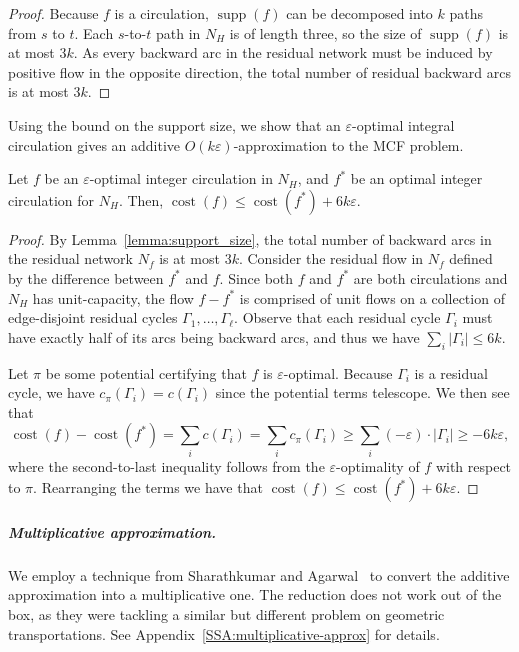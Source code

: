 \documentclass[a4paper,UKenglish]{socg-lipics-v2018}
\def\eps{\varepsilon}
\def\cost{\operatorname{cost}}
\def\supp{\operatorname{supp}}
\theoremstyle{plain}
\numberwithin{figure}{section}
\renewcommand{\paragraph}{\subparagraph}
\begin{document}
\begin{proof}
Because $f$ is a circulation, $\supp(f)$ can be decomposed into $k$  paths from $s$ to $t$.
Each $s$-to-$t$ path in $N_H$ is of length three, so the size of $\supp(f)$ is at most $3k$.
As every backward arc in the residual network must be induced by positive flow in the opposite direction,
the total number of residual backward arcs is at most $3k$.
\end{proof}

Using the bound on the support size, we show that an $\eps$-optimal integral circulation gives an additive $O(k\eps)$-approximation to the MCF problem.

\begin{lemmarep}
\label{lemma:goldberg_cost_add}
Let $f$ be an $\eps$-optimal integer circulation in $N_H$, and $f^*$ be an optimal integer circulation for $N_H$.
Then, $\cost(f) \leq \cost(f^*) + 6k\eps$.
\end{lemmarep}

\begin{proof}
By Lemma~\ref{lemma:support_size}, the total number of backward arcs in the residual network $N_f$ is at most $3k$.
%
Consider the residual flow in $N_f$ defined by the difference between $f^*$ and $f$.
Since both $f$ and $f^*$ are both circulations and $N_H$ has unit-capacity,
the flow $f - f^*$ is comprised of unit flows on a collection of edge-disjoint residual cycles $\Gamma_1, \ldots, \Gamma_\ell$.
Observe that each residual cycle $\Gamma_i$ must have exactly half of its arcs being backward arcs, and thus we have $\sum_i |\Gamma_i| \leq 6k$.

Let $\pi$ be some potential certifying that $f$ is $\eps$-optimal.
Because $\Gamma_i$ is a residual cycle, we have $c_\pi(\Gamma_i) = c(\Gamma_i)$ since the potential terms telescope.
We then see that
\[
	\cost(f) - \cost(f^*)
	= \sum_i c(\Gamma_i)
	= \sum_i c_\pi(\Gamma_i)
	\geq \sum_i (-\eps) \cdot |\Gamma_i|
	\geq -6k\eps,
\]
where the second-to-last inequality follows from the $\eps$-optimality of $f$
with respect to $\pi$.
Rearranging the terms we have that $\cost(f) \leq \cost(f^*) + 6k\eps$.
\end{proof}


\paragraph{Multiplicative approximation.}
We employ a technique from Sharathkumar and Agarwal~\cite{SA12} to convert the
additive approximation into a multiplicative one.
The reduction does not work out of the box, as they were tackling a similar but
different problem on geometric transportations.
See Appendix~\ref{SSA:multiplicative-approx} for details.
\end{document}
